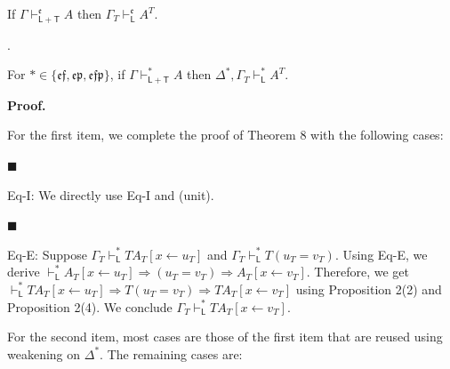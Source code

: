 If $\Gamma\vdash_{\mathsf{L}+\mathsf{T}}^{\mathfrak{e}}A$ then $\Gamma_{T}\vdash_{\mathsf{L}}^{\mathfrak{e}}A^{T}$.\par
 
 
 
\par{}. 
 
For $*\in\{\mathfrak{e}\mathfrak{f},\mathfrak{e}\mathfrak{p},\mathfrak{e}\mathfrak{f}\mathfrak{p}\}$, if $\Gamma\vdash_{\mathsf{L}+\mathsf{T}}^{*}A$ then $\Delta^{*},\Gamma_{T}\vdash_{\mathsf{L}}^{*}A^{T}$.\par
 
 
  
 
 
 
 
\par\medskip\noindent\textbf{Proof.}\par
 
 
For the first item, we complete the proof of Theorem 8 with the following cases:\par
  
\par\noindent  $\blacksquare$ 
 
Eq-I: We directly use Eq-I and (unit).\par
 
 
 
\par\noindent  $\blacksquare$ 
 
Eq-E: Suppose $\Gamma_{T}\vdash_{\mathsf{L}}^{*}TA_{T}[x\leftarrow u_{T}]$ and $\Gamma_{T}\vdash_{\mathsf{L}}^{*}T(u_{T}=v_{T})$. Using Eq-E, we derive $\vdash_{\mathsf{L}}^{*}A_{T}[x\leftarrow u_{T}]\mathbin{\Rightarrow}(u_{T}=v_{T})\mathbin{\Rightarrow}A_{T}[x\leftarrow v_{T}]$. Therefore, we get $\vdash_{\mathsf{L}}^{*}TA_{T}[x\leftarrow u_{T}]\mathbin{\Rightarrow}T(u_{T}=v_{T})\mathbin{\Rightarrow}TA_{T}[x\leftarrow v_{T}]$ using Proposition 2(2) and Proposition 2(4). We conclude $\Gamma_{T}\vdash_{\mathsf{L}}^{*}TA_{T}[x\leftarrow v_{T}]$.\par
 
 
  
For the second item, most cases are those of the first item that are reused using weakening on $\Delta^{*}$. The remaining cases are:\par
  
